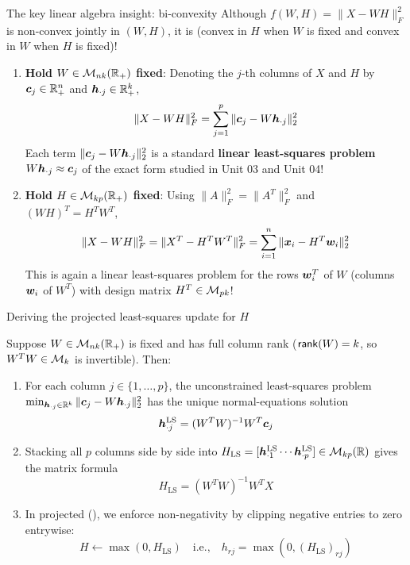 \documentclass[aspectratio=169]{beamer}\usepackage[]{graphicx}\usepackage[]{xcolor}
\begin{document}
\begin{frame}{The key linear algebra insight: bi-convexity}
Although $f(W, H) = \|X - W H\|_F^2$ is non-convex jointly in $(W, H)$, it is  (convex in $H$ when $W$ is fixed and convex in $W$ when $H$ is fixed)!
\vfill
\begin{enumerate}
\item \textbf{Hold $W \in \mathcal{M}_{nk}(\mathbb{R}_+)$ fixed}: Denoting the $j$-th columns of $X$ and $H$ by $\bm{c}_j \in \mathbb{R}_+^n$ and $\bm{h}_{\cdot j} \in \mathbb{R}_+^k$,
\[
\|X - W H\|_F^2 = \sum_{j=1}^p \|\bm{c}_j - W \bm{h}_{\cdot j}\|_2^2
\]
Each term $\|\bm{c}_j - W \bm{h}_{\cdot j}\|_2^2$ is a standard \textbf{linear least-squares problem} $W \bm{h}_{\cdot j} \approx \bm{c}_j$ of the exact form studied in Unit 03 and Unit 04!
\vfill
\item \textbf{Hold $H \in \mathcal{M}_{kp}(\mathbb{R}_+)$ fixed}: Using $\|A\|_F^2 = \|A^T\|_F^2$ and $(WH)^T = H^T W^T$,
\[
\|X - W H\|_F^2 = \|X^T - H^T W^T\|_F^2 = \sum_{i=1}^n \|\bm{x}_i - H^T \bm{w}_i\|_2^2
\]
This is again a linear least-squares problem for the rows $\bm{w}_i^T$ of $W$ (columns $\bm{w}_i$ of $W^T$) with design matrix $H^T \in \mathcal{M}_{pk}$!
\end{enumerate}
\end{frame}


\begin{frame}{Deriving the projected least-squares update for $H$}
\begin{proposition}\label{prop:als_H_step}
Suppose $W \in \mathcal{M}_{nk}(\mathbb{R}_+)$ is fixed and has full column rank ($\mathsf{rank}(W) = k$, so $W^T W \in \mathcal{M}_k$ is invertible). Then:
\begin{enumerate}
\item For each column $j \in \{1, \ldots, p\}$, the unconstrained least-squares problem $\min_{\bm{h}_{\cdot j} \in \mathbb{R}^k} \|\bm{c}_j - W \bm{h}_{\cdot j}\|_2^2$ has the unique normal-equations solution
\[
\bm{h}_{\cdot j}^{\text{LS}} = (W^T W)^{-1} W^T \bm{c}_j
\]
\item Stacking all $p$ columns side by side into $H_{\text{LS}} = [\bm{h}_{\cdot 1}^{\text{LS}} \cdots \bm{h}_{\cdot p}^{\text{LS}}] \in \mathcal{M}_{kp}(\mathbb{R})$ gives the matrix formula
\[
H_{\text{LS}} = (W^T W)^{-1} W^T X
\]
\item In projected  (), we enforce non-negativity by clipping negative entries to zero entrywise:
\[
H \leftarrow \max(0, H_{\text{LS}}) \quad\textrm{i.e.,}\quad h_{rj} = \max\!\left(0, (H_{\text{LS}})_{rj}\right)
\]
\end{enumerate}
\end{proposition}
\end{frame}
\end{document}
